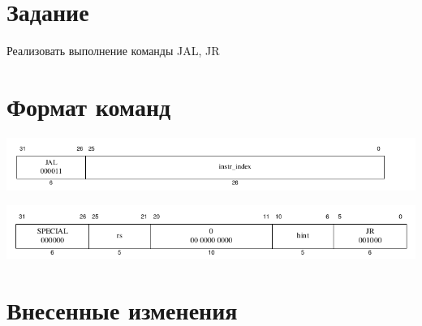 

\usepackage{graphicx}
\fancyhead[LR]{}

\def \labnum {4}
\def \labsubj {Схемотехника ЭВМ}
\def \labauthor {Айтуганов Д. А. \\ Чебыкин И. Б.}
\def \labgroup {P3301}
\def \labinsp {Баевских А. Н.}
\def \labname {Вариант: 2}

\isnametrue
\lstset{
	caption=\lstname,
	basicstyle=\ttfamily\selectfont\scriptsize
}



\tableofcontents
\newpage
\section{Задание}
Реализовать выполнение команды JAL, JR
\section{Формат команд}

\includegraphics[width=\textwidth]{img/jal.png}

\includegraphics[width=\textwidth]{img/jr.png}

\section{Внесенные изменения}


